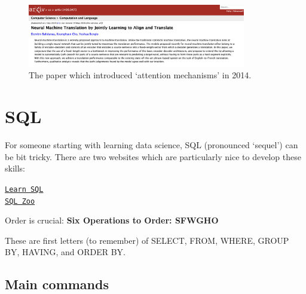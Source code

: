 \documentclass[11pt]{article}
\begin{document}
\begin{figure}
\centering 
\includegraphics[width=0.85\textwidth]{paper1.png}
\caption{\label{fig:PAPER1}The paper which introduced `attention mechanisms' in 2014.}
\end{figure}


\section{SQL}

For someone starting with learning data science, SQL (pronounced `sequel') can be bit tricky. 
There are two websites which are particularly nice to develop these skills:

\href{https://learnsql.com/blog}{\texttt{Learn SQL}}  \\ 
\href{https://sqlzoo.net/wiki/SQL_Tutorial}{\texttt{SQL Zoo}} 

% 

Order is crucial: \textbf{Six Operations to Order: SFWGHO}

These are first letters (to remember) of SELECT, FROM, WHERE, GROUP BY, HAVING, and ORDER BY. 


\subsection{Main commands} 
\end{document}
